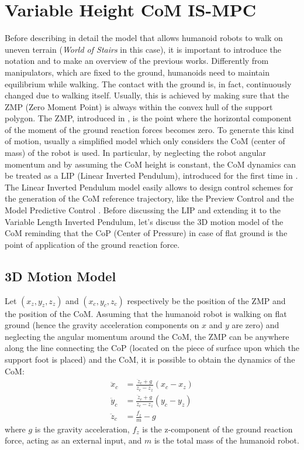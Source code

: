 \chapter{Variable Height CoM IS-MPC}
Before describing in detail the model \cite{SYROCO18} that allows humanoid 
robots to walk on uneven terrain (\textit{World of Stairs} in this case),
it is important to introduce the notation and 
to make an overview of the previous works.
Differently from manipulators, which are fixed to the ground, humanoids need 
to maintain equilibrium while walking. The contact with the ground is, in fact,
continuously changed due to walking itself. Usually, this is achieved by 
making sure that the ZMP (Zero Moment Point) is always within the convex hull 
of the support polygon. The ZMP, introduced in \cite{VUKOBRATOVIC19721}, is the 
point where the horizontal component of the moment of the ground reaction forces
becomes zero. To generate this kind of motion, usually a simplified model 
which only considers the CoM (center of mass) of the robot is used.
In particular, by neglecting the robot angular momentum and by assuming the 
CoM height is constant, the CoM dynamics can be treated as a LIP (Linear 
Inverted Pendulum), introduced for the first time in \cite{Kajita1991StudyOD}.
The Linear Inverted Pendulum model easily allows to design control schemes for 
the generation of the CoM reference trajectory, like the Preview Control 
\cite{Kajita2003BipedWP} and the Model Predictive Control
\cite{wieber:inria-00390462}.
Before discussing the LIP and extending it to the Variable Length Inverted
Pendulum, let's discuss the 3D motion model of the CoM reminding that the CoP
(Center of Pressure) in case of flat ground is the point of application of
the ground reaction force.

\section{3D Motion Model}
Let $(x_z, y_z, z_z)$ and $(x_c, y_c, z_c)$ respectively be the position of 
the ZMP and the position of the CoM. Assuming that the humanoid robot is walking 
on flat ground (hence the gravity acceleration components on $x$ and $y$ are 
zero) and neglecting the angular momentum around the CoM, the ZMP can be 
anywhere along the line connecting the CoP (located on the piece of surface 
upon which the support foot is placed) and the CoM, it is possible
\cite{kajita:intro-humanoid-robotics} to obtain the dynamics of the CoM:
\begin{align}
  \ddot{x}_c &= \frac{\ddot{z}_c + g}{z_c - z_z} (x_c - x_z) \\
  \ddot{y}_c &= \frac{\ddot{z}_c + g}{z_c - z_z} (y_c - y_z) \\
  \ddot{z}_c &= \frac{f_z}{m} - g
\end{align}
where $g$ is the gravity acceleration, $f_z$ is the z-component of the ground
reaction force, acting as an external input, and $m$ is the total mass of
the humanoid robot.

